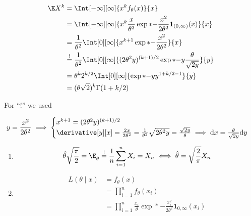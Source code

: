 \begin{solution}

\begin{align*}
    \E X^k
    & =
    \Int[-\infty][\infty]
    {
        x^k f_\theta(x)
    }{x} \\
    & =
    \Int[-\infty][\infty]
    {
        x^k \frac{x}{\theta^2} \exp*{-\frac{x^2}{2 \theta^2}} \mathbf 1_{(0, \infty)}(x)
    }{x} \\
    & =
    \frac{1}{\theta^2}
    \Int[0][\infty]
    {
        x^{k+1}
        \exp*{-\frac{x^2}{2 \theta^2}}
    }{x} \\
    & \stackrel{!}{=}
    \frac{1}{\theta^2}
    \Int[0][\infty]
    {
        (2 \theta^2 y)^{(k + 1) / 2}
        \exp*{-y}
        \frac{\theta}{\sqrt{2 y}}
    }{y} \\
    & =
    \theta^k 2^{k / 2}
    \Int[0][\infty]
    {
        \exp*{-y}
        y^{1 + k / 2 - 1}
    }{y} \\
    & =
    (\theta \sqrt 2)^k
    \Gamma(1 + k / 2)
\end{align*}

For \enquote{!} we used

\begin{align*}
    y = \frac{x^2}{2 \theta^2}
    \implies
    \begin{cases}
        x^{k+1} = (2 \theta^2 y)^{(k + 1) / 2} \\
        \derivative[y][x] = \frac{2 x}{2 \theta^2} = \frac{1}{\theta^2} \sqrt{2 \theta^2 y} = \frac{\sqrt{2 y}}{\theta}
        \implies
        \mathrm d x = \frac{\theta}{\sqrt{2 y}} \mathrm d y
    \end{cases}
\end{align*}

\begin{enumerate}[label = (\alph*)]

    \item

    \begin{align*}
        \hat \theta \sqrt \frac{\pi}{2} = \E_{\hat \theta} \stackrel{!}{=} \frac{1}{n} \sum_{i=1}^n X_i = \bar X_n
        \iff
        \hat \theta = \sqrt \frac{2}{\pi} \bar X_n
    \end{align*}

    \item

    \begin{align*}
        L(\theta \mid x)
        & =
        f_\theta(x) \\
        & =
        \prod_{i=1}^n
            f_\theta(x_i) \\
        & =
        \prod_{i=1}^n
            \frac{x_i}{\theta} \exp*{-\frac{x_i^2}{2 \theta^2}} \mathbf 1_{0, \infty}(x_i)
    \end{align*}


\end{enumerate}
\end{solution}
